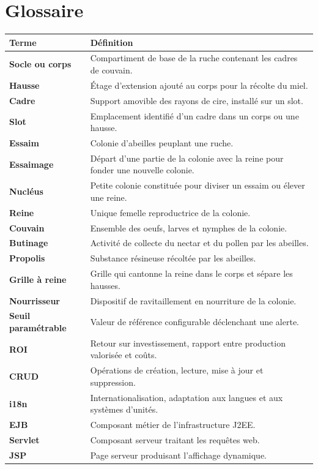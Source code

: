 \chapter{Glossaire}
\begin{xltabular}{\textwidth}{>{\bfseries}p{4cm} X}
\toprule
\textbf{Terme} & \textbf{Définition} \\
\midrule
\endhead
Socle ou corps & Compartiment de base de la ruche contenant les cadres de couvain. \\
Hausse & Étage d'extension ajouté au corps pour la récolte du miel. \\
Cadre & Support amovible des rayons de cire, installé sur un slot. \\
Slot & Emplacement identifié d'un cadre dans un corps ou une hausse. \\
Essaim & Colonie d'abeilles peuplant une ruche. \\
Essaimage & Départ d'une partie de la colonie avec la reine pour fonder une nouvelle colonie. \\
Nucléus & Petite colonie constituée pour diviser un essaim ou élever une reine. \\
Reine & Unique femelle reproductrice de la colonie. \\
Couvain & Ensemble des oeufs, larves et nymphes de la colonie. \\
Butinage & Activité de collecte du nectar et du pollen par les abeilles. \\
Propolis & Substance résineuse récoltée par les abeilles. \\
Grille à reine & Grille qui cantonne la reine dans le corps et sépare les hausses. \\
Nourrisseur & Dispositif de ravitaillement en nourriture de la colonie. \\
Seuil paramétrable & Valeur de référence configurable déclenchant une alerte. \\
ROI & Retour sur investissement, rapport entre production valorisée et coûts. \\
CRUD & Opérations de création, lecture, mise à jour et suppression. \\
i18n & Internationalisation, adaptation aux langues et aux systèmes d'unités. \\
EJB & Composant métier de l'infrastructure J2EE. \\
Servlet & Composant serveur traitant les requêtes web. \\
JSP & Page serveur produisant l'affichage dynamique. \\

\end{xltabular}
